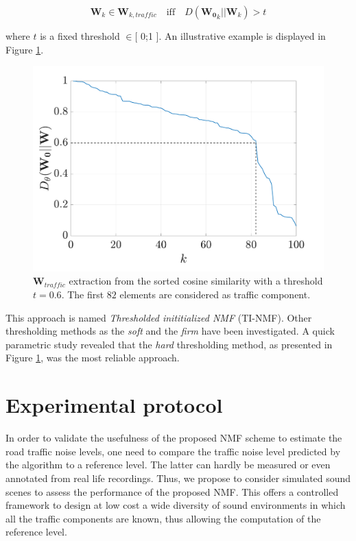 \documentclass[twocolumn]{svjour3}          %
\begin{document}
\begin{equation}
\mathbf{W}_k \in \mathbf{W}_{k,traffic} \quad \text{iff} \quad D\left(\mathbf{W_0}_k \vert \vert \mathbf{W}_{k} \right) > t
\end{equation}

where $t$ is a fixed threshold $\in [$ 0;1 $]$.
An illustrative example is displayed in Figure \ref{fig:W_TI_NMF}.\\

\begin{figure}[t]
\centering
\includegraphics[width=0.8\linewidth]{figures/distanceCosLinDisplay.pdf}
\caption{$\mathbf{W}_{traffic}$ extraction from the sorted cosine similarity with a threshold $t = 0.6$. The first $82$ elements are considered as traffic component.}
\label{fig:W_TI_NMF}
\end{figure}

This approach is named \textit{Thresholded inititialized NMF} (TI-NMF). Other thresholding methods as the \textit{soft} \cite{donoho1995noising} and the \textit{firm} \cite{fornasier2008iterative} have been investigated. A quick parametric study revealed that the \textit{hard} thresholding method, as presented in  Figure \ref{fig:W_TI_NMF}, was the most reliable approach.

\section{Experimental protocol}\label{part:protocol}

In order to validate the usefulness of the proposed NMF scheme to estimate the road traffic noise levels, one need to compare the traffic noise level predicted by the algorithm to a reference level. The latter can hardly be measured or even annotated from real life recordings. Thus,  we propose to consider simulated sound scenes to assess the performance of the proposed NMF. This offers a controlled framework to design at low cost a wide diversity of sound environments in which all the traffic components are known, thus allowing the computation of the reference level.
\end{document}
